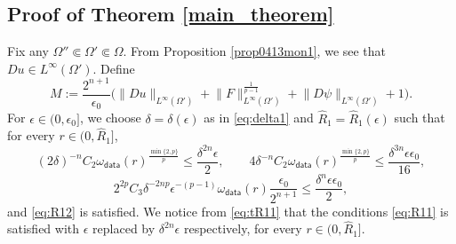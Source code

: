 \documentclass[reqno]{amsart}
\numberwithin{equation}{section}
\theoremstyle{plain}
\theoremstyle{definition}
\theoremstyle{remark}
\providecommand{\set}[1]{\{#1\}}
\providecommand{\norm}[1]{\lVert#1\rVert}
\begin{document}
\subsection{Proof of Theorem \ref{main_theorem}}

Fix any $\Omega''\Subset\Omega'\Subset \Omega$. From Proposition \ref{prop0413mon1}, we see that 
$Du\in L^\infty(\Omega')$. 
Define 
\[
M:=\frac{2^{n+1}}{\epsilon_0}\big( \norm{Du}_{L^\infty(\Omega')}  +   \norm{F}_{L^\infty(\Omega')}
^{\frac{1}{p-1}}+\norm{D\psi}_{L^\infty(\Omega')} +1   \big).
\]
For $\epsilon\in (0,\epsilon_0]$, we choose $\delta=\delta(\epsilon)$ as in \eqref{eq:delta1} and $\hat R_{1}=\hat R_{1}(\epsilon)$ such that for every $r\in(0,\hat R_1]$,
\begin{equation}\label{eq:tR11}
(2\delta)^{-n} C_2 \omega_{\mathsf{data}}(r)^{\frac{\min\set{2,p}}{p}}\le \frac{\delta^{2n} \epsilon}{2}, 
\qquad 4\delta^{-n}C_2 \omega_{\mathsf{data}}(r)^{\frac{\min\set{2,p}}{p}}\le  \frac{\delta^{3n} \epsilon \epsilon_0 }{16},
\end{equation}
\begin{equation}\label{eq:tR12}
2^{2p}C_3\delta^{-2np}  \epsilon^{-(p-1)}\omega_{\mathsf{data}}(r)   \frac{\epsilon_0}{2^{n+1}} \le \frac{\delta^n\epsilon \epsilon_0}{2},
\end{equation}
and \eqref{eq:R12} is satisfied.
We notice from  \eqref{eq:tR11} that the conditions \eqref{eq:R11} is satisfied with $\epsilon$ replaced by  $\delta^{2n}\epsilon$ respectively, for every $r\in(0,\hat R_1]$.
\end{document}
